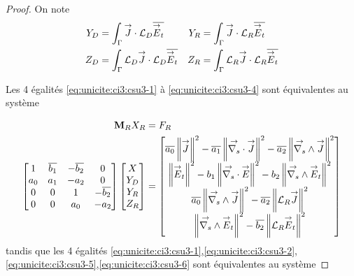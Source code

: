 \begin{proof}
    On note
    \begin{align*}
      Y_D &= \int_\Gamma \vJ \cdot \LD \conj{\vE_t}  &
      Y_R &= \int_\Gamma \vJ \cdot \LR \conj{\vE_t} 
      \\
      Z_D &= \int_\Gamma \LD \vJ \cdot \LD \conj{\vE_t}  &
      Z_R &= \int_\Gamma \LR \vJ \cdot \LR \conj{\vE_t} 
    \end{align*}

    Les 4 égalités \eqref{eq:unicite:ci3:csu3-1} à \eqref{eq:unicite:ci3:csu3-4} sont équivalentes au système

    \begin{align*}
      \mM_R X_R &= F_R
      \\
      \begin{bmatrix}
        1 & \conj{b_1} & -\conj{b_2} & 0
        \\
        a_0 & a_1 & -a_2 & 0
        \\
        0 & 0 & 1 & -\conj{b_2}
        \\
        0 & 0 & a_0 & -a_2
        \\
      \end{bmatrix}
      \begin{bmatrix}
        X\\
        Y_D\\
        Y_R\\
        Z_R
      \end{bmatrix}
      &=
      \begin{bmatrix}
        \conj{a_0} \norm{\vJ}^2 - \conj{a_1} \norm{\vdivs \vJ}^2 - \conj{a_2} \norm{\vrots \vJ}^2
        \\
        \norm{\vE_t}^2  - b_1 \norm{\vdivs \vE}^2  - b_2 \norm{\vrots \vE_t}^2
        \\
        \conj{a_0} \norm{\vrots \vJ}^2 - \conj{a_2} \norm{\LR \vJ}^2
        \\
        \norm{\vrots \vE_t}^2 - \conj{b_2} \norm{\LR \vE_t}^2
      \end{bmatrix}
    \end{align*}
    tandis que les 4 égalités \eqref{eq:unicite:ci3:csu3-1},\eqref{eq:unicite:ci3:csu3-2},\eqref{eq:unicite:ci3:csu3-5},\eqref{eq:unicite:ci3:csu3-6} sont équivalentes au système


\end{proof}

